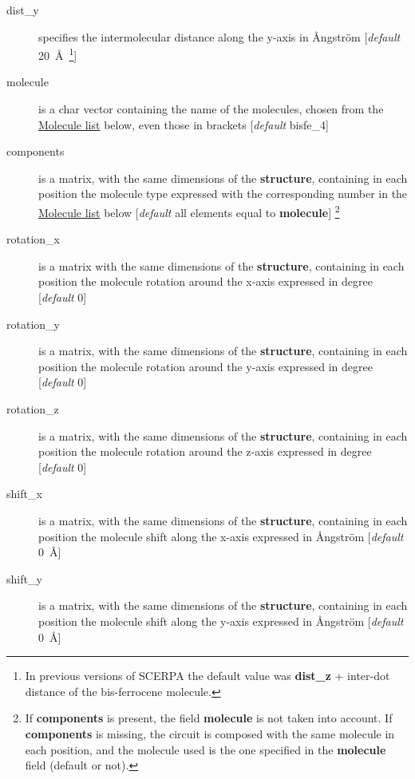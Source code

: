 \documentclass[a4paper,10pt]{article}
\begin{document}
\begin{description}
\item[dist\_y] specifies the intermolecular distance along the y-axis in \r{A}ngstr\"{o}m [\textit{default} 20~\AA~\footnote{In previous versions of SCERPA the default value was \textbf{dist\_z} + inter-dot distance of the bis-ferrocene molecule.}]

\item[molecule] is a char vector containing the name of the molecules, chosen from the \underline{Molecule list} below, even those in brackets [\textit{default} bisfe\_4] 

\item[components] is a matrix, with the same dimensions of the \textbf{structure}, containing in each position the molecule type expressed with the corresponding number in the \underline{Molecule list} below [\textit{default} all elements equal to \textbf{molecule}] \footnote{If \textbf{components} is present, the field \textbf{molecule} is not taken into account. If \textbf{components} is missing, the circuit is composed with the same molecule in each position, and the molecule used is the one specified in the \textbf{molecule} field (default or not).}

\item[rotation\_x] is a matrix with the same dimensions of the \textbf{structure}, containing in each position the molecule rotation around the x-axis expressed in degree [\textit{default} 0\textdegree]

\item[rotation\_y] is a matrix, with the same dimensions of the \textbf{structure}, containing in each position the molecule rotation around the y-axis expressed in degree [\textit{default} 0\textdegree]

\item[rotation\_z] is a matrix, with the same dimensions of the \textbf{structure}, containing in each position the molecule rotation around the z-axis expressed in degree [\textit{default} 0\textdegree]

\item[shift\_x] is a matrix, with the same dimensions of the \textbf{structure}, containing in each position the molecule shift along the x-axis expressed in \r{A}ngstr\"{o}m [\textit{default} 0~\AA]

\item[shift\_y] is a matrix, with the same dimensions of the \textbf{structure}, containing in each position the molecule shift along the y-axis expressed in \r{A}ngstr\"{o}m [\textit{default} 0~\AA]


\end{description}
\end{document}
